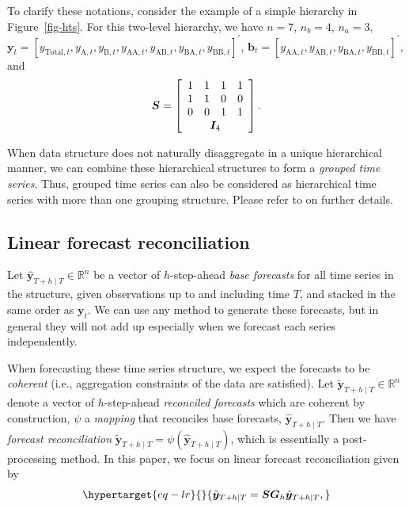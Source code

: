\documentclass[11pt,a4paper,]{article}
\begin{document}
To clarify these notations, consider the example of a simple hierarchy
in Figure~\ref{fig-hts}. For this two-level hierarchy, we have
\(n = 7\), \(n_b = 4\), \(n_a = 3\),
\(\boldsymbol{y}_t = [y_{\text{Total},t}, y_{\text{A},t}, y_{\text{B},t}, y_{\text{AA},t}, y_{\text{AB},t}, y_{\text{BA},t}, y_{\text{BB},t}]^{\prime}\),
\(\boldsymbol{b}_t = [y_{\text{AA},t}, y_{\text{AB},t}, y_{\text{BA},t}, y_{\text{BB},t}]^{\prime}\),
and \[
\boldsymbol{S} = \left[
\begin{array}{cccc}
1 & 1 & 1 & 1 \\
1 & 1 & 0 & 0 \\
0 & 0 & 1 & 1 \\
\multicolumn{4}{c}{\boldsymbol{I}_4}
\end{array}\right].
\]

When data structure does not naturally disaggregate in a unique
hierarchical manner, we can combine these hierarchical structures to
form a \emph{grouped time series}. Thus, grouped time series can also be
considered as hierarchical time series with more than one grouping
structure. Please refer to \textcite{Hyndman2021-fo} on further details.

\hypertarget{linear-forecast-reconciliation}{%
\subsection{Linear forecast
reconciliation}\label{linear-forecast-reconciliation}}

Let \(\hat{\boldsymbol{y}}_{T+h \mid T} \in \mathbb{R}^n\) be a vector
of \(h\)-step-ahead \emph{base forecasts} for all time series in the
structure, given observations up to and including time \(T\), and
stacked in the same order as \(\boldsymbol{y}_t\). We can use any method
to generate these forecasts, but in general they will not add up
especially when we forecast each series independently.

When forecasting these time series structure, we expect the forecasts to
be \emph{coherent} (i.e., aggregation constraints of the data are
satisfied). Let \(\tilde{\boldsymbol{y}}_{T+h \mid T} \in \mathbb{R}^n\)
denote a vector of \(h\)-step-ahead \emph{reconciled forecasts} which
are coherent by construction, \(\psi\) a \emph{mapping} that reconciles
base forecasts, \(\hat{\boldsymbol{y}}_{T+h \mid T}\). Then we have
\emph{forecast reconciliation}
\(\tilde{\boldsymbol{y}}_{T+h \mid T}=\psi(\hat{\boldsymbol{y}}_{T+h \mid T})\),
which is essentially a post-processing method. In this paper, we focus
on linear forecast reconciliation given by
\begin{equation}\protect\hypertarget{eq-lr}{}{
\tilde{\boldsymbol{y}}_{T+h \mid T} = \boldsymbol{S}\boldsymbol{G}_h\hat{\boldsymbol{y}}_{T+h \mid T},
}\label{eq-lr}\end{equation}
\end{document}

